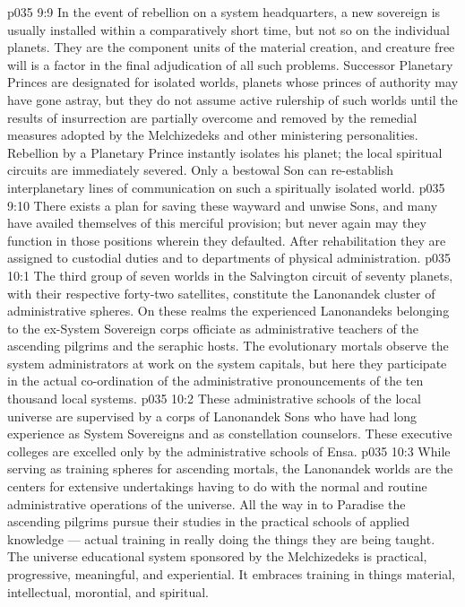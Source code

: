 \vs p035 9:9 \pc In the event of rebellion on a system headquarters, a new sovereign is usually installed within a comparatively short time, but not so on the individual planets. They are the component units of the material creation, and creature free will is a factor in the final adjudication of all such problems. Successor Planetary Princes are designated for isolated worlds, planets whose princes of authority may have gone astray, but they do not assume active rulership of such worlds until the results of insurrection are partially overcome and removed by the remedial measures adopted by the Melchizedeks and other ministering personalities. Rebellion by a Planetary Prince instantly isolates his planet; the local spiritual circuits are immediately severed. Only a bestowal Son can re\hyp{}establish interplanetary lines of communication on such a spiritually isolated world.
\vs p035 9:10 There exists a plan for saving these wayward and unwise Sons, and many have availed themselves of this merciful provision; but never again may they function in those positions wherein they defaulted. After rehabilitation they are assigned to custodial duties and to departments of physical administration.
\vs p035 10:1 The third group of seven worlds in the Salvington circuit of seventy planets, with their respective forty\hyp{}two satellites, constitute the Lanonandek cluster of administrative spheres. On these realms the experienced Lanonandeks belonging to the ex\hyp{}System Sovereign corps officiate as administrative teachers of the ascending pilgrims and the seraphic hosts. The evolutionary mortals observe the system administrators at work on the system capitals, but here they participate in the actual co\hyp{}ordination of the administrative pronouncements of the ten thousand local systems.
\vs p035 10:2 These administrative schools of the local universe are supervised by a corps of Lanonandek Sons who have had long experience as System Sovereigns and as constellation counselors. These executive colleges are excelled only by the administrative schools of Ensa.
\vs p035 10:3 While serving as training spheres for ascending mortals, the Lanonandek worlds are the centers for extensive undertakings having to do with the normal and routine administrative operations of the universe. All the way in to Paradise the ascending pilgrims pursue their studies in the practical schools of applied knowledge --- actual training in really doing the things they are being taught. The universe educational system sponsored by the Melchizedeks is practical, progressive, meaningful, and experiential. It embraces training in things material, intellectual, morontial, and spiritual.
